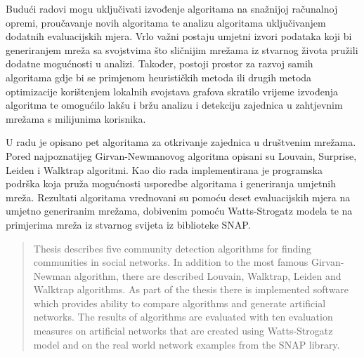 \documentclass[times, utf8, diplomski]{fer}
\begin{document}
Budući radovi mogu uključivati izvođenje algoritama na snažnijoj računalnoj opremi, proučavanje novih algoritama te analizu algoritama uključivanjem dodatnih evaluacijskih mjera. Vrlo važni postaju umjetni izvori podataka koji bi generiranjem mreža sa svojstvima što sličnijim mrežama iz stvarnog života pružili dodatne mogućnosti u analizi. Također, postoji prostor za razvoj samih algoritama gdje bi se primjenom heurističkih metoda ili drugih metoda optimizacije korištenjem lokalnih svojstava grafova skratilo vrijeme izvođenja algoritma te omogućilo lakšu i bržu analizu i detekciju zajednica u zahtjevnim mrežama s milijunima korisnika.






\begin{sazetak}
U radu je opisano pet algoritama za otkrivanje zajednica u društvenim mrežama. Pored najpoznatijeg Girvan-Newmanovog algoritma opisani su Louvain, Surprise, Leiden i Walktrap algoritmi. Kao dio rada implementirana je programska podrška koja pruža mogućnosti usporedbe algoritama i generiranja umjetnih mreža. Rezultati algoritama vrednovani su pomoću deset evaluacijskih mjera na umjetno generiranim mrežama, dobivenim pomoću Watts-Strogatz modela te na primjerima mreža iz stvarnog svijeta iz biblioteke SNAP. 

\end{sazetak}

\begin{abstract}
Thesis describes five community detection algorithms for finding communities in social networks. In addition to the most famous Girvan-Newman algorithm, there are described Louvain, Walktrap, Leiden and Walktrap algorithms. As part of the thesis there is implemented software which provides ability to compare algorithms and generate artificial networks. The results of algorithms are evaluated with ten evaluation measures on artificial networks that are created using Watts-Strogatz model and on the real world network examples from the SNAP library.

\end{abstract}
\end{document}
